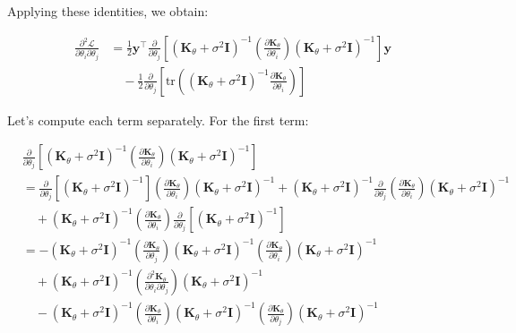 Applying these identities, we obtain:

\begin{align*}
\frac{\partial^2 \mathcal{L}}{\partial \theta_i \partial \theta_j} &= \frac{1}{2} \mathbf{y}^\top \frac{\partial}{\partial \theta_j} \left[ (\mathbf{K}_\theta + \sigma^2 \mathbf{I})^{-1} \left(\frac{\partial \mathbf{K}_\theta}{\partial \theta_i}\right) (\mathbf{K}_\theta + \sigma^2 \mathbf{I})^{-1} \right] \mathbf{y} \\
&\quad - \frac{1}{2} \frac{\partial}{\partial \theta_j} \left[ \text{tr}\left((\mathbf{K}_\theta + \sigma^2 \mathbf{I})^{-1} \frac{\partial \mathbf{K}_\theta}{\partial \theta_i}\right) \right]
\end{align*}

Let's compute each term separately. For the first term:

\begin{align*}
&\frac{\partial}{\partial \theta_j} \left[ (\mathbf{K}_\theta + \sigma^2 \mathbf{I})^{-1} \left(\frac{\partial \mathbf{K}_\theta}{\partial \theta_i}\right) (\mathbf{K}_\theta + \sigma^2 \mathbf{I})^{-1} \right] \\
&= \frac{\partial}{\partial \theta_j} [(\mathbf{K}_\theta + \sigma^2 \mathbf{I})^{-1}] \left(\frac{\partial \mathbf{K}_\theta}{\partial \theta_i}\right) (\mathbf{K}_\theta + \sigma^2 \mathbf{I})^{-1} + (\mathbf{K}_\theta + \sigma^2 \mathbf{I})^{-1} \frac{\partial}{\partial \theta_j} \left(\frac{\partial \mathbf{K}_\theta}{\partial \theta_i}\right) (\mathbf{K}_\theta + \sigma^2 \mathbf{I})^{-1} \\
&\quad + (\mathbf{K}_\theta + \sigma^2 \mathbf{I})^{-1} \left(\frac{\partial \mathbf{K}_\theta}{\partial \theta_i}\right) \frac{\partial}{\partial \theta_j} [(\mathbf{K}_\theta + \sigma^2 \mathbf{I})^{-1}] \\
&= -(\mathbf{K}_\theta + \sigma^2 \mathbf{I})^{-1} \left(\frac{\partial \mathbf{K}_\theta}{\partial \theta_j}\right) (\mathbf{K}_\theta + \sigma^2 \mathbf{I})^{-1} \left(\frac{\partial \mathbf{K}_\theta}{\partial \theta_i}\right) (\mathbf{K}_\theta + \sigma^2 \mathbf{I})^{-1} \\
&\quad + (\mathbf{K}_\theta + \sigma^2 \mathbf{I})^{-1} \left(\frac{\partial^2 \mathbf{K}_\theta}{\partial \theta_i \partial \theta_j}\right) (\mathbf{K}_\theta + \sigma^2 \mathbf{I})^{-1} \\
&\quad - (\mathbf{K}_\theta + \sigma^2 \mathbf{I})^{-1} \left(\frac{\partial \mathbf{K}_\theta}{\partial \theta_i}\right) (\mathbf{K}_\theta + \sigma^2 \mathbf{I})^{-1} \left(\frac{\partial \mathbf{K}_\theta}{\partial \theta_j}\right) (\mathbf{K}_\theta + \sigma^2 \mathbf{I})^{-1}
\end{align*}

